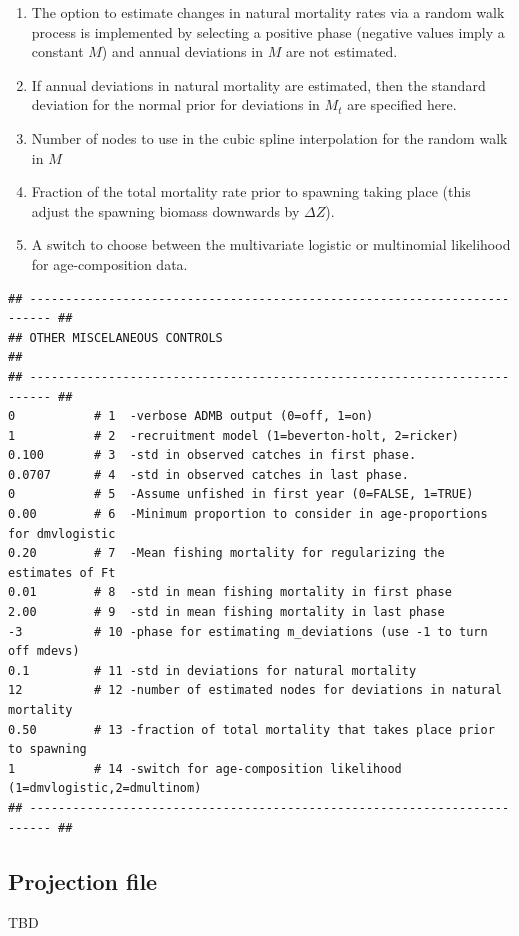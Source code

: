 \begin{multicols}{2}
\begin{enumerate}
	\item The option to estimate changes in natural mortality rates via a random walk process is implemented by selecting a positive phase (negative values imply a constant $M$) and annual deviations in $M$ are not estimated.
	
	\item  If annual deviations in natural mortality are estimated, then the standard deviation for the normal prior for deviations in $M_t$ are specified here.
	
	\item Number of nodes to use in the cubic spline interpolation for the random walk in $M$
	
	\item Fraction of the total mortality rate prior to spawning taking place (this adjust the spawning biomass downwards by $\Delta Z$).
	
	\item A switch to choose between the multivariate logistic or multinomial likelihood for age-composition data.
\end{enumerate}




\begin{tiny}
\begin{verbatim}
## ------------------------------------------------------------------------- ##
## OTHER MISCELANEOUS CONTROLS                                               ##
## ------------------------------------------------------------------------- ##
0           # 1  -verbose ADMB output (0=off, 1=on)
1           # 2  -recruitment model (1=beverton-holt, 2=ricker)
0.100       # 3  -std in observed catches in first phase.
0.0707      # 4  -std in observed catches in last phase.
0           # 5  -Assume unfished in first year (0=FALSE, 1=TRUE)
0.00        # 6  -Minimum proportion to consider in age-proportions for dmvlogistic
0.20        # 7  -Mean fishing mortality for regularizing the estimates of Ft
0.01        # 8  -std in mean fishing mortality in first phase
2.00        # 9  -std in mean fishing mortality in last phase
-3          # 10 -phase for estimating m_deviations (use -1 to turn off mdevs)
0.1         # 11 -std in deviations for natural mortality
12          # 12 -number of estimated nodes for deviations in natural mortality
0.50        # 13 -fraction of total mortality that takes place prior to spawning
1           # 14 -switch for age-composition likelihood (1=dmvlogistic,2=dmultinom)
## ------------------------------------------------------------------------- ##
\end{verbatim}
\end{tiny}



\subsection{Projection file} %
\label{sub:projection_file}
TBD


\end{multicols}

